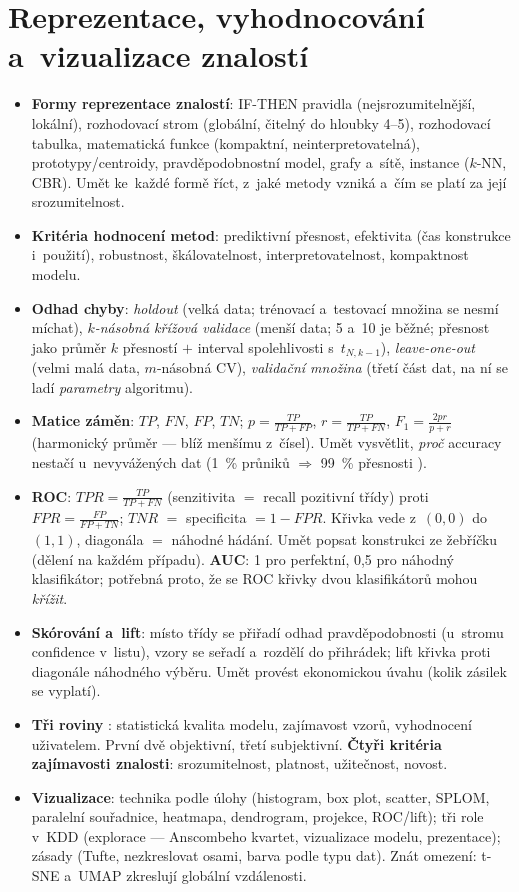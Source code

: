 \documentclass[11pt,a4paper]{article}
\theoremstyle{definition}
\begin{document}
\section{Reprezentace, vyhodnocování a~vizualizace znalostí}
\begin{itemize}
\item \textbf{Formy reprezentace znalostí}: IF-THEN pravidla (nejsrozumitelnější, lokální),
 rozhodovací strom (globální, čitelný do hloubky 4--5), rozhodovací tabulka, matematická
 funkce (kompaktní, neinterpretovatelná), prototypy/centroidy, pravděpodobnostní model,
 grafy a~sítě, instance ($k$-NN, CBR). Umět ke~každé formě říct, z~jaké metody vzniká
 a~čím se platí za její srozumitelnost.
\item \textbf{Kritéria hodnocení metod}: prediktivní přesnost, efektivita (čas konstrukce
 i~použití), robustnost, škálovatelnost, interpretovatelnost, kompaktnost modelu.
\item \textbf{Odhad chyby}: \emph{holdout} (velká data; trénovací a~testovací množina se
 nesmí míchat), \emph{$k$-násobná křížová validace} (menší data; 5 a~10 je běžné;
 přesnost jako průměr $k$ přesností $+$ interval spolehlivosti s~$t_{N,k-1}$),
 \emph{leave-one-out} (velmi malá data, $m$-násobná CV), \emph{validační množina} (třetí
 část dat, na ní se ladí \emph{parametry} algoritmu).
\item \textbf{Matice záměn}: $TP$, $FN$, $FP$, $TN$; $p=\frac{TP}{TP+FP}$,
 $r=\frac{TP}{TP+FN}$, $F_1=\frac{2pr}{p+r}$ (harmonický průměr --- blíž menšímu
 z~čísel). Umět vysvětlit, \emph{proč} accuracy nestačí u~nevyvážených dat (1~\% průniků
 $\Rightarrow$ 99~\% přesnosti ).
\item \textbf{ROC}: $\mathit{TPR}=\frac{TP}{TP+FN}$ (senzitivita $=$ recall pozitivní třídy)
 proti $\mathit{FPR}=\frac{FP}{FP+TN}$; $\mathit{TNR}$ $=$ specificita
 $=1-\mathit{FPR}$. Křivka vede z~$(0,0)$ do $(1,1)$, diagonála $=$ náhodné hádání.
 Umět popsat konstrukci ze žebříčku (dělení na každém případu). \textbf{AUC}: 1 pro
 perfektní, 0,5 pro náhodný klasifikátor; potřebná proto, že se ROC křivky dvou
 klasifikátorů mohou \emph{křížit}.
\item \textbf{Skórování a~lift}: místo třídy se přiřadí odhad pravděpodobnosti (u~stromu
 confidence v~listu), vzory se seřadí a~rozdělí do přihrádek; lift křivka proti
 diagonále náhodného výběru. Umět provést ekonomickou úvahu (kolik zásilek se vyplatí).
\item \textbf{Tři roviny }: statistická kvalita modelu, zajímavost vzorů,
 vyhodnocení uživatelem. První dvě objektivní, třetí subjektivní. \textbf{Čtyři kritéria
 zajímavosti znalosti}: srozumitelnost, platnost, užitečnost, novost.
\item \textbf{Vizualizace}: technika podle úlohy (histogram, box plot, scatter, SPLOM,
 paralelní souřadnice, heatmapa, dendrogram, projekce, ROC/lift); tři role v~KDD
 (explorace --- Anscombeho kvartet, vizualizace modelu, prezentace); zásady (Tufte,
 nezkreslovat osami, barva podle typu dat). Znát omezení: t-SNE a~UMAP zkreslují
 globální vzdálenosti.
\end{itemize}
\end{document}
